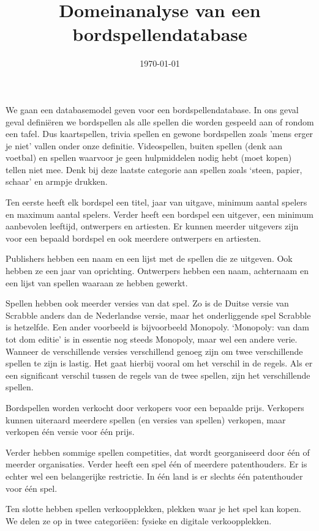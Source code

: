 \documentclass[a4paper, dutch, parskip=full]{scrartcl}
\begin{document}
\title{Domeinanalyse van een bordspellendatabase}
\author{}
\date{\today}
\maketitle
We gaan een databasemodel geven voor een bordspellendatabase.
In ons geval geval defini\"{e}ren we bordspellen als alle spellen die worden gespeeld aan of rondom een
tafel.
Dus kaartspellen, trivia spellen en gewone bordspellen zoals 'mens erger je niet' vallen onder onze
definitie.
Videospellen, buiten spellen (denk aan voetbal) en spellen waarvoor je geen hulpmiddelen nodig hebt
(moet kopen) tellen niet mee.
Denk bij deze laatste categorie aan spellen zoals `steen, papier, schaar' en armpje drukken.

Ten eerste heeft elk bordspel een titel, jaar van uitgave, minimum aantal spelers en maximum aantal
spelers.
Verder heeft een bordspel een uitgever, een minimum aanbevolen leeftijd, ontwerpers en artiesten.
Er kunnen meerder uitgevers zijn voor een bepaald bordspel en ook meerdere ontwerpers en artiesten.

Publishers hebben een naam en een lijst met de spellen die ze uitgeven.
Ook hebben ze een jaar van oprichting.
Ontwerpers hebben een naam, achternaam en een lijst van spellen waaraan ze hebben gewerkt.

Spellen hebben ook meerder versies van dat spel.
Zo is de Duitse versie van Scrabble anders dan de Nederlandse versie, maar het onderliggende spel
Scrabble is hetzelfde.
Een ander voorbeeld is bijvoorbeeld Monopoly.
`Monopoly: van dam tot dom editie' is in essentie nog steeds Monopoly, maar wel een andere verie.
Wanneer de verschillende versies verschillend genoeg zijn om twee verschillende spellen te zijn is
lastig.
Het gaat hierbij vooral om het verschil in de regels.
Als er een significant verschil tussen de regels van de twee spellen, zijn het verschillende spellen.

Bordspellen worden verkocht door verkopers voor een bepaalde prijs.
Verkopers kunnen uiteraard meerdere spellen (en versies van spellen) verkopen, maar verkopen
\'{e}\'{e}n versie voor \'{e}\'{e}n prijs.

Verder hebben sommige spellen competities, dat wordt georganiseerd door \'{e}\'{e}n of meerder organisaties.
Verder heeft een spel \'{e}\'{e}n of meerdere patenthouders.
Er is echter wel een belangerijke restrictie.
In \'{e}\'{e}n land is er slechts \'{e}\'{e}n patenthouder voor \'{e}\'{e}n spel.

Ten slotte hebben spellen verkoopplekken, plekken waar je het spel kan kopen.
We delen ze op in twee categori\"{e}en: fysieke en digitale verkoopplekken.
\end{document}
